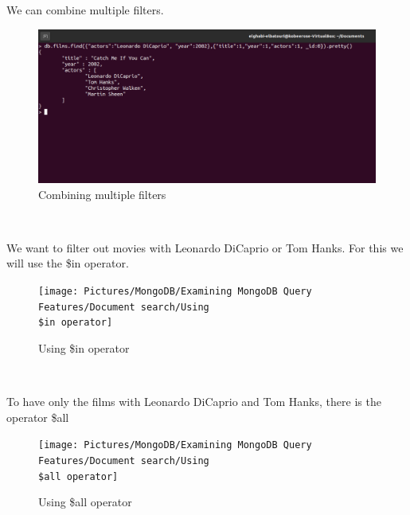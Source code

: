 \begin{spacing}{0.9}
\par We can combine multiple filters.
\\
\begin{figure}[!htb] 
\begin{center} 
\includegraphics[width=1\linewidth]{Pictures/MongoDB/Examining MongoDB Query Features/Document search/Combining multiple filters} 
\end{center} 
\caption{Combining multiple filters} 
\end{figure}  \FloatBarrier
\\
\newpage
\par We want to filter out movies with Leonardo DiCaprio or Tom Hanks. For this we will use
the \$in operator.
\\
\begin{figure}[!htb] 
\begin{center} 
\texttt{[image: Pictures/MongoDB/Examining MongoDB Query Features/Document search/Using \\\$in operator]} 
\end{center} 
\caption{Using \$in operator} 
\end{figure}  \FloatBarrier
\\

\par To have only the films with Leonardo DiCaprio and Tom Hanks, there is the operator \$all
\\
\begin{figure}[!htb] 
\begin{center} 
\texttt{[image: Pictures/MongoDB/Examining MongoDB Query Features/Document search/Using \\\$all operator]} 
\end{center} 
\caption{Using \$all operator} 
\end{figure}  \FloatBarrier
\\
\newpage

\end{spacing}
